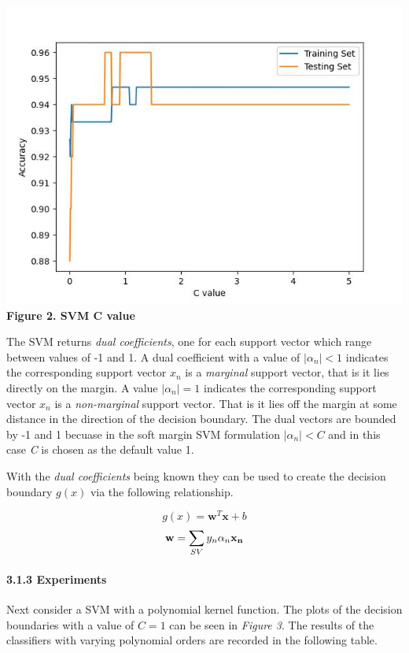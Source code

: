 \documentclass[11pt]{article}
\begin{document}
\includegraphics{figures/3_1_C_change.jpg}\\
\textbf{Figure 2. SVM C value}

The SVM returns \emph{dual coefficients}, one for each support vector
which range between values of -1 and 1. A dual coefficient with a value
of \(|\alpha_{n}| < 1\) indicates the corresponding support vector
\(x_{n}\) is a \emph{marginal} support vector, that is it lies directly
on the margin. A value \(|\alpha_{n}| = 1\) indicates the corresponding
support vector \(x_{n}\) is a \emph{non-marginal} support vector. That
is it lies off the margin at some distance in the direction of the
decision boundary. The dual vectors are bounded by -1 and 1 becuase in
the soft margin SVM formulation \(|\alpha_{n}| < C\) and in this case
\emph{C} is chosen as the default value 1.

With the \emph{dual coefficients} being known they can be used to create
the decision boundary \(g(x)\) via the following relationship.

\[
g(x) = \textbf{w}^{T}\textbf{x} + b
\] \[
\textbf{w} = \sum_{SV}{y_{n}\alpha_{n}\bf{x_{n}}}
\]

    \hypertarget{experiments}{%
\paragraph{3.1.3 Experiments}\label{experiments}}

Next consider a SVM with a polynomial kernel function. The plots of the
decision boundaries with a value of \(C=1\) can be seen in \emph{Figure
3}. The results of the classifiers with varying polynomial orders are
recorded in the following table.
\end{document}
